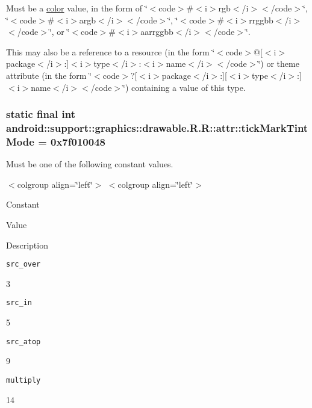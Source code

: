 Must be a \hyperlink{classandroid_1_1support_1_1graphics_1_1drawable_1_1_r_1_1color}{color} value, in the form of \char`\"{}$<$code$>$\#$<$i$>$rgb$<$/i$>$$<$/code$>$\char`\"{}, \char`\"{}$<$code$>$\#$<$i$>$argb$<$/i$>$$<$/code$>$\char`\"{}, \char`\"{}$<$code$>$\#$<$i$>$rrggbb$<$/i$>$$<$/code$>$\char`\"{}, or \char`\"{}$<$code$>$\#$<$i$>$aarrggbb$<$/i$>$$<$/code$>$\char`\"{}. 

This may also be a reference to a resource (in the form \char`\"{}$<$code$>$@\mbox{[}$<$i$>$package$<$/i$>$:\mbox{]}$<$i$>$type$<$/i$>$:$<$i$>$name$<$/i$>$$<$/code$>$\char`\"{}) or theme attribute (in the form \char`\"{}$<$code$>$?\mbox{[}$<$i$>$package$<$/i$>$:\mbox{]}\mbox{[}$<$i$>$type$<$/i$>$:\mbox{]}$<$i$>$name$<$/i$>$$<$/code$>$\char`\"{}) containing a value of this type. \hypertarget{classandroid_1_1support_1_1graphics_1_1drawable_1_1_r_1_1attr_b7540ea2807fac282fea404f1f6dbf44}{
\subsubsection[{tickMarkTintMode}]{\setlength{\rightskip}{0pt plus 5cm}static final int android::support::graphics::drawable.R.R::attr::tickMarkTintMode = 0x7f010048}}
\label{classandroid_1_1support_1_1graphics_1_1drawable_1_1_r_1_1attr_b7540ea2807fac282fea404f1f6dbf44}


Must be one of the following constant values. \begin{TabularC}{0}
\hline
\end{TabularC}
$<$colgroup align=\char`\"{}left\char`\"{}$>$ $<$colgroup align=\char`\"{}left\char`\"{}$>$ 

Constant

Value

Description 

{\tt src\_\-over}

3

{\tt src\_\-in}

5

{\tt src\_\-atop}

9

{\tt multiply}

14

